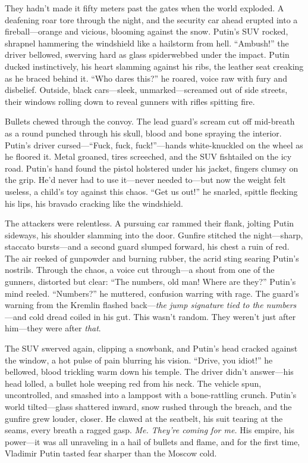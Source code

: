 \documentclass[12pt]{book}
\begin{document}
They hadn’t made it fifty meters past the gates when the world exploded. A deafening roar tore through the night, and the security car ahead erupted into a fireball—orange and vicious, blooming against the snow. Putin’s SUV rocked, shrapnel hammering the windshield like a hailstorm from hell. “Ambush!” the driver bellowed, swerving hard as glass spiderwebbed under the impact. Putin ducked instinctively, his heart slamming against his ribs, the leather seat creaking as he braced behind it. “Who dares this?” he roared, voice raw with fury and disbelief. Outside, black cars—sleek, unmarked—screamed out of side streets, their windows rolling down to reveal gunners with rifles spitting fire.

Bullets chewed through the convoy. The lead guard’s scream cut off mid-breath as a round punched through his skull, blood and bone spraying the interior. Putin’s driver cursed—“Fuck, fuck, fuck!”—hands white-knuckled on the wheel as he floored it. Metal groaned, tires screeched, and the SUV fishtailed on the icy road. Putin’s hand found the pistol holstered under his jacket, fingers clumsy on the grip. He’d never had to use it—never needed to—but now the weight felt useless, a child’s toy against this chaos. “Get us out!” he snarled, spittle flecking his lips, his bravado cracking like the windshield.

The attackers were relentless. A pursuing car rammed their flank, jolting Putin sideways, his shoulder slamming into the door. Gunfire stitched the night—sharp, staccato bursts—and a second guard slumped forward, his chest a ruin of red. The air reeked of gunpowder and burning rubber, the acrid sting searing Putin’s nostrils. Through the chaos, a voice cut through—a shout from one of the gunners, distorted but clear: “The numbers, old man! Where are they?” Putin’s mind reeled. “Numbers?” he muttered, confusion warring with rage. The guard’s warning from the Kremlin flashed back—\textit{the jump signature tied to the numbers}—and cold dread coiled in his gut. This wasn’t random. They weren’t just after him—they were after \textit{that}.

The SUV swerved again, clipping a snowbank, and Putin’s head cracked against the window, a hot pulse of pain blurring his vision. “Drive, you idiot!” he bellowed, blood trickling warm down his temple. The driver didn’t answer—his head lolled, a bullet hole weeping red from his neck. The vehicle spun, uncontrolled, and smashed into a lamppost with a bone-rattling crunch. Putin’s world tilted—glass shattered inward, snow rushed through the breach, and the gunfire grew louder, closer. He clawed at the seatbelt, his suit tearing at the seams, every breath a ragged gasp. \textit{Me. They’re coming for me.} His empire, his power—it was all unraveling in a hail of bullets and flame, and for the first time, Vladimir Putin tasted fear sharper than the Moscow cold.
\end{document}
